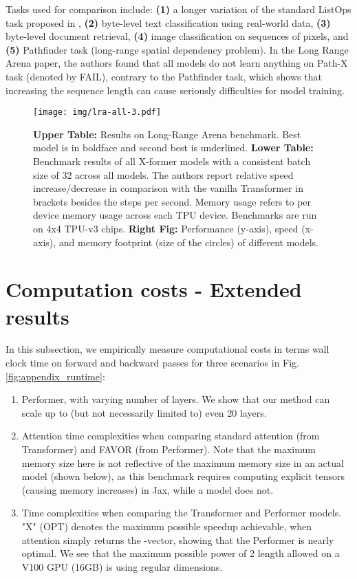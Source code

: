 Tasks used for comparison include: \textbf{(1)} a longer variation of the standard ListOps task proposed in \citep{listops}, \textbf{(2)} byte-level text classification using real-world data, \textbf{(3)} byte-level document retrieval, \textbf{(4)} image classification on sequences of pixels, and \textbf{(5)} Pathfinder task (long-range spatial dependency problem). In the Long Range Arena paper, the authors found that all models do not learn anything on Path-X task (denoted by FAIL), contrary to the Pathfinder task, which shows that increasing the sequence length can cause seriously difficulties for model training.
\vspace{0.2cm}
\begin{figure}[h]
  \centering
  \texttt{[image: img/lra-all-3.pdf]}
  \vspace{0.15cm}
  \caption{\textbf{Upper Table:} Results on Long-Range Arena benchmark. Best model is in boldface and second best is underlined. \textbf{Lower Table:} Benchmark results of all X-former models with a consistent batch size of 32 across all models. The authors report relative speed increase/decrease in comparison with the vanilla Transformer in brackets besides the steps per second. Memory usage refers to per device memory usage across each TPU device. Benchmarks are run on 4x4 TPU-v3 chips. \textbf{Right Fig:} Performance (y-axis), speed (x-axis), and memory footprint (size of the circles) of different models.} 
  \label{fig:lra_figure}
\end{figure}

\newpage 

\section{Computation costs - Extended results}

In this subsection, we empirically measure computational costs in terms wall clock time on forward and backward passes for three scenarios in Fig. \ref{fig:appendix_runtime}:
\begin{enumerate}
\item Performer, with varying number of layers. We show that our method can scale up to (but not necessarily limited to) even 20 layers.
\item Attention time complexities when comparing standard attention (from Transformer) and FAVOR (from Performer). Note that the maximum memory size here is not reflective of the maximum memory size in an actual model (shown below), as this benchmark requires computing explicit tensors (causing memory increases) in Jax, while a model does not.
\item Time complexities when comparing the Transformer and Performer models. "X" (OPT) denotes the maximum possible speedup achievable, when attention simply returns the -vector, showing that the Performer is nearly optimal. We see that the maximum possible power of 2 length allowed on a V100 GPU (16GB) is  using regular dimensions.
\end{enumerate}

